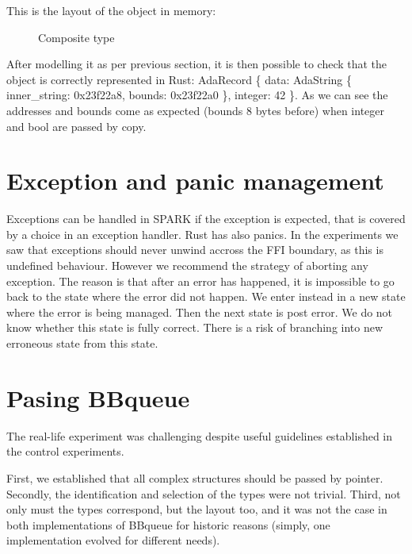 \documentclass[nomenclature, english, bibtex]{kththesis}
\begin{document}
This is the layout of the object in memory:

\begin{figure}[ht!]
    \centering
  \caption{Composite type}
  \label{fig:memlayout}
\end{figure}

After modelling it as per previous section, it is then possible to check that the object is correctly represented in Rust: AdaRecord \{ data: AdaString \{ inner\_string: 0x23f22a8, bounds: 0x23f22a0 \}, integer: 42 \}. As we can see the addresses and bounds come as expected (bounds 8 bytes before) when integer and bool are passed by copy.

\section{Exception and panic management}


Exceptions can be handled in SPARK if the exception is expected, that is covered by a choice in an exception handler. Rust has also panics. In the experiments we saw that exceptions should never unwind accross the FFI boundary, as this is undefined behaviour. However we recommend the strategy of aborting any exception. The reason is that after an error has happened, it is impossible to go back to the state where the error did not happen. We enter instead in a new state where the error is being managed. Then the next state is post error. We do not know whether this state is fully correct. There is a risk of branching into new erroneous state from this state.

\section{Pasing BBqueue}

The real-life experiment was challenging despite useful guidelines established in the control experiments.

First, we established that all complex structures should be passed by pointer.
Secondly, the identification and selection of the types were not trivial.
Third, not only must the types correspond, but the layout too, and it was not the case in both implementations of BBqueue for historic reasons (simply, one implementation evolved for different needs).
\end{document}
